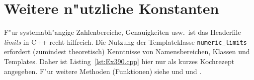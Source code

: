 \section{Weitere n"utzliche Konstanten}
\label{p:3.9}
%
F"ur systemabh"angige Zahlenbereiche, Genauigkeiten usw.\   ist
das Headerfile \emph{limits} in C++ recht hilfreich.
%
%
Die Nutzung der Templateklasse \texttt{numeric\_limits} erfordert (zumindest theoretisch)
Kenntnisse von Namensbereichen, Klassen und Templates.
Daher ist Listing~\ref{lst:Ex390.cpp} hier nur als kurzes Kochrezept angegeben.
F"ur weitere Methoden (Funktionen) siehe \cite[p.710]{KirchPrinz:2002:OOP}
und \cite[\S13.5]{KuhlinsSchader:2002:DCS} und \cite[\S7.3.4]{Wolf:2006:CAZ}.
%
%

